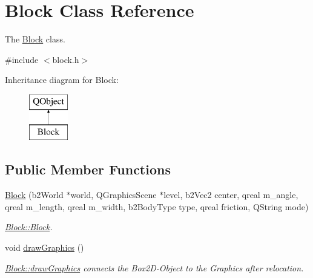 \hypertarget{class_block}{}\section{Block Class Reference}
\label{class_block}


The \hyperlink{class_block}{Block} class.  




{\ttfamily \#include $<$block.\+h$>$}

Inheritance diagram for Block\+:\begin{figure}[H]
\begin{center}
\leavevmode
\includegraphics[height=2.000000cm]{class_block}
\end{center}
\end{figure}
\subsection*{Public Member Functions}
\begin{DoxyCompactItemize}
\item 
\hyperlink{class_block_acb9ba4b4221f41d888628a434052af6e}{Block} (b2\+World $\ast$world, Q\+Graphics\+Scene $\ast$level, b2\+Vec2 center, qreal m\+\_\+angle, qreal m\+\_\+length, qreal m\+\_\+width, b2\+Body\+Type type, qreal friction, Q\+String mode)
\begin{DoxyCompactList}\small\item\em \hyperlink{class_block_acb9ba4b4221f41d888628a434052af6e}{Block\+::\+Block}. \end{DoxyCompactList}\item 
void \hyperlink{class_block_a38b7625137a54cf57193c844163f9532}{draw\+Graphics} ()
\begin{DoxyCompactList}\small\item\em \hyperlink{class_block_a38b7625137a54cf57193c844163f9532}{Block\+::draw\+Graphics} connects the Box2\+D-\/\+Object to the Graphics after relocation. \end{DoxyCompactList}\end{DoxyCompactItemize}
